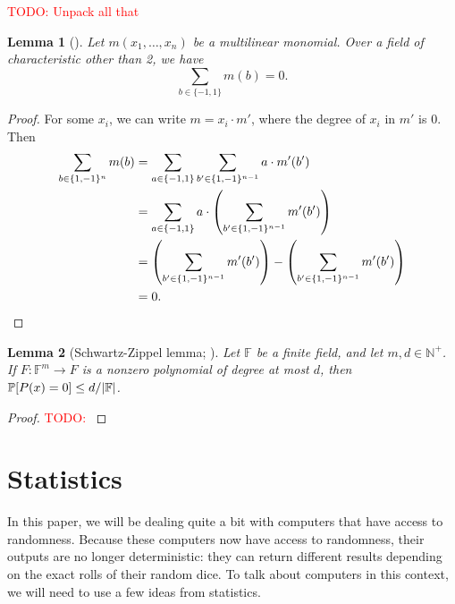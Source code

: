 \documentclass[english,12pt]{reedthesis}
\theoremstyle{plain}
\newtheorem{lemma}[lemma]{Lemma}
\theoremstyle{definition}
\theoremstyle{remark}
\DeclarePairedDelimiter{\abs}{\lvert}{\rvert}
\newcommand{\TODO}[1]{\textcolor{red}{TODO: #1}}
\begin{document}
\TODO{Unpack all that}

\begin{lemma}[{\cite[Lemma 7]{JKRS09}}]\label{lem:monomial-sum}
  Let $m(x_{1}, \ldots, x_{n})$ be a multilinear monomial. Over a field of
  characteristic other than 2, we have
  \begin{equation}
    \sum_{b \in \{-1, 1\}}m(b) = 0.
  \end{equation}
\end{lemma}

\begin{proof}
  For some $x_{i}$, we can write $m = x_{i} \cdot m'$, where the degree of $x_{i}$
  in $m'$ is 0. Then
  \begin{align*}
    \sum_{b \in \{1, -1\}^{n}}m(b)
    &= \sum_{a \in \{-1, 1\}}\sum_{b' \in \{1, -1\}^{n-1}}a \cdot m'(b') \\
    &= \sum_{a \in \{-1, 1\}} a \cdot \mleft(\sum_{b' \in \{1, -1\}^{n-1}} m'(b')\mright) \\
    &= \mleft(\sum_{b' \in \{1, -1\}^{n-1}} m'(b')\mright) - \mleft(\sum_{b' \in \{1, -1\}^{n-1}} m'(b')\mright) \\
    &= 0.
  \end{align*}
\end{proof}

\begin{lemma}[Schwartz-Zippel lemma; \cite{Sch80,Zip79}]%
  \label{lem:schwartz-zippel}
  Let $\mathbb{F}$ be a finite field, and let $m, d \in \mathbb{N}^{+}$. If
  $F\colon \mathbb{F}^{m} \rightarrow F$ is a nonzero polynomial of degree at most $d$, then
  $\mathbb{P}[P(x) = 0] \le d/\abs{\mathbb{F}}$.
\end{lemma}

\begin{proof}
  \TODO{}
\end{proof}

\section{Statistics}

In this paper, we will be dealing quite a bit with computers that have access to
randomness. Because these computers now have access to randomness, their outputs
are no longer deterministic: they can return different results depending on the
exact rolls of their random dice. To talk about computers in this context, we
will need to use a few ideas from statistics.
\end{document}

